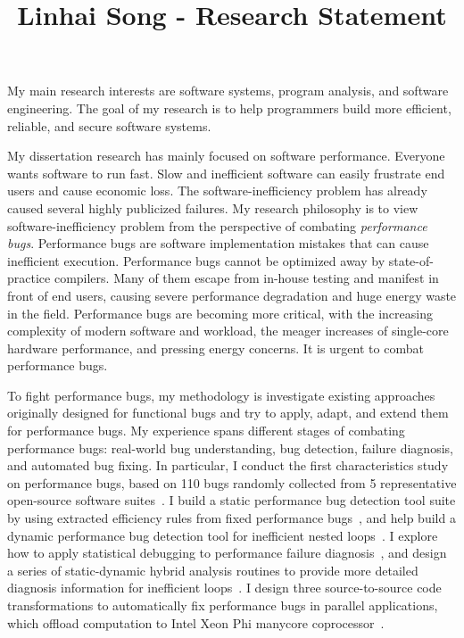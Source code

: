 \documentclass[10pt]{article}
\title{\vspace{-.7in}\bf{Linhai Song - Research Statement\vspace{-.4in}}}
\date{}
\begin{document}
\maketitle\vspace{-.2in}

My main research interests are software systems, 
program analysis, and software engineering. 
The goal of my research is to help programmers build more efficient, reliable, and secure software systems.

My dissertation research has mainly focused on software performance. 
Everyone wants software to run fast. 
Slow and inefficient software can easily frustrate end users and cause economic loss. 
The software-inefficiency problem has already caused several highly publicized failures. 
My research philosophy is to view software-inefficiency problem from the perspective of combating \textit{performance bugs}.
Performance bugs are software implementation mistakes that can cause inefficient execution. 
Performance bugs cannot be optimized away by state-of-practice compilers.
Many of them escape from in-house testing and manifest in front of end users, 
causing severe performance degradation and huge energy waste in the field. 
Performance bugs are becoming more critical, with the increasing complexity of modern software and workload, 
the meager increases of single-core hardware performance, 
and pressing energy concerns. 
It is urgent to combat performance bugs.

To fight performance bugs, my methodology is investigate existing approaches originally
designed for functional bugs and try to apply, adapt, and extend them
for performance bugs.
My experience spans different
stages of combating performance bugs: real-world bug understanding, bug detection,
failure diagnosis, and automated bug fixing.
In particular, I conduct the first characteristics study on performance bugs, based on 110 bugs 
randomly collected from 5 representative open-source software suites~\cite{jin12perfbug}.
I build a static performance bug detection tool suite by using extracted efficiency rules from fixed performance bugs~\cite{jin12perfbug}, 
and help build a dynamic performance bug detection tool for inefficient nested loops~\cite{Nistor13ICSE}. 
I explore how to apply statistical debugging to performance failure diagnosis~\cite{Song14OOPSLA}, 
and design a series of static-dynamic hybrid analysis routines to provide more detailed diagnosis information for inefficient loops~\cite{Song16PLDI}.
I design three source-to-source code transformations to automatically fix performance bugs in 
parallel applications, which offload computation to Intel Xeon Phi manycore coprocessor~\cite{Song14MICRO}. 
\end{document}
